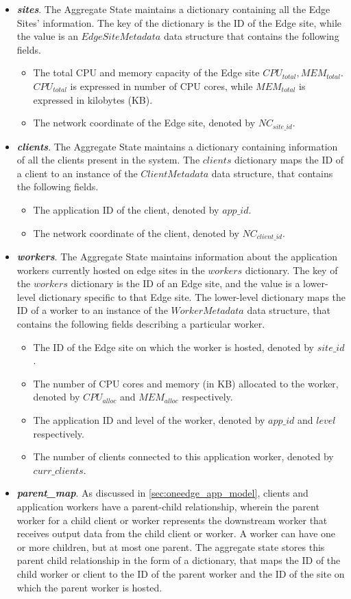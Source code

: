 \begin{itemize}
\item \textit{\textbf{sites}}. The Aggregate State maintains a dictionary containing all the Edge Sites' information. The key of the dictionary is the ID of the Edge site, while the value is an $EdgeSiteMetadata$ data structure that contains the following fields.
\begin{itemize}
\item The total CPU and memory capacity of the Edge site $CPU_{total}, MEM_{total}$. $CPU_{total}$ is expressed in number of CPU cores, while $MEM_{total}$ is expressed in kilobytes (KB).
\item The network coordinate of the Edge site, denoted by $NC_{site\_id}$.
\end{itemize}
\item \textit{\textbf{clients}}. The Aggregate State maintains a dictionary containing information of all the clients present in the system. The $clients$ dictionary maps the ID of a client to an instance of the $ClientMetadata$ data structure, that contains the following fields.
\begin{itemize}
\item The application ID of the client, denoted by $app\_id$.
\item The network coordinate of the client, denoted by $NC_{client\_id}$.
\end{itemize}
\item \textit{\textbf{workers}}. The Aggregate State maintains information about the application workers currently hosted on edge sites in the $workers$ dictionary. The key of the $workers$ dictionary is the ID of an Edge site, and the value is a lower-level dictionary specific to that Edge site. The lower-level dictionary maps the ID of a worker to an instance of the $WorkerMetadata$ data structure, that contains the following fields describing a particular worker.
\begin{itemize}
\item The ID of the Edge site on which the worker is hosted, denoted by $site\_id$.
\item The number of CPU cores and memory (in KB) allocated to the worker, denoted by $CPU_{alloc}$ and $MEM_{alloc}$ respectively.
\item The application ID and level of the worker, denoted by $app\_id$ and $level$ respectively.
\item The number of clients connected to this application worker, denoted by $curr\_clients$.
\end{itemize}
\item \textit{\textbf{parent\_map}}. As discussed in \cref{sec:oneedge_app_model}, clients and application workers have a parent-child relationship, wherein the parent worker for a child client or worker represents the downstream worker that receives output data from the child client or worker. A worker can have one or more children, but at most one parent. The aggregate state stores this parent child relationship in the form of a dictionary, that maps the ID of the child worker or client to the ID of the parent worker and the ID of the site on which the parent worker is hosted.
\end{itemize}
